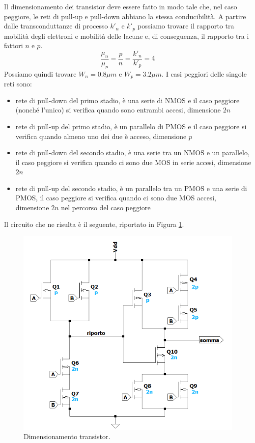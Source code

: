 \documentclass[a4paper,10pt]{article}
\begin{document}
Il dimensionamento dei transistor deve essere fatto in modo tale che, nel caso peggiore, le reti di pull-up e pull-down abbiano la stessa conducibilità. A partire dalle transconduttanze di processo $k'_n$ e $k'_p$ possiamo trovare il rapporto tra mobilità degli elettroni e mobilità delle lacune e, di conseguenza, il rapporto tra i fattori $\textit{n}$ e $\textit{p}$.
\begin{equation*}
\frac{\mu _n}{\mu _p} = \frac{p}{n} = \frac{k'_n}{k'_p} = 4
\end{equation*}
Possiamo quindi trovare $W_n=0.8\mu m$ e $W_p=3.2\mu m$. I casi peggiori delle singole reti sono:
\begin{itemize}
\item rete di pull-down del primo stadio, è una serie di NMOS e il caso peggiore (nonché l'unico) si verifica quando sono entrambi accesi, dimensione $\textit{2n}$
\item rete di pull-up del primo stadio, è un parallelo di PMOS e il caso peggiore si verifica quando almeno uno dei due è acceso, dimensione $\textit{p}$
\item rete di pull-down del secondo stadio, è una serie tra un NMOS e un parallelo, il caso peggiore si verifica quando ci sono due MOS in serie accesi, dimensione $\textit{2n}$
\item rete di pull-up del secondo stadio, è un parallelo tra un PMOS e una serie di PMOS, il caso peggiore si verifica quando ci sono due MOS accesi, dimensione $\textit{2n}$ nel percorso del caso peggiore
\end{itemize}
Il circuito che ne risulta è il seguente, riportato in Figura \ref{fig:dimensionamento}.
\begin{figure}[h!]
  	\centering
 	\includegraphics[width=0.7\linewidth]{es2-dimens.png}
  	\caption{Dimensionamento transistor.}
  	\label{fig:dimensionamento}
\end{figure}
\end{document}
